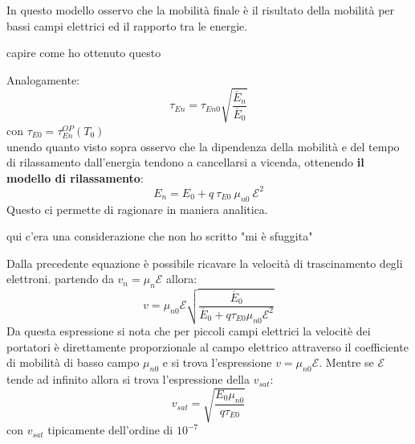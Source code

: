 %
\begin{exbox}
    In questo modello osservo che la mobilità finale è il risultato della mobilità per bassi campi elettrici ed il rapporto tra le energie.
\end{exbox}
%
\begin{ricevimento}
    capire come ho ottenuto questo
\end{ricevimento}
%
Analogamente:
%
\begin{equation}
    \tau_{En}=\tau_{En0}\sqrt{\dfrac{\overline{E}_n}{\overline{E}_0}}
\end{equation}
%
con $\tau_{E0}=\tau_{En}^{OP}(T_0)$\\
unendo quanto visto sopra osservo che la dipendenza della mobilità e del tempo di rilassamento dall'energia tendono a cancellarsi a vicenda, ottenendo \textbf{il modello di rilassamento}:
%
\begin{equation}
    E_n=E_0+q\ \tau_{E0}\ \mu_{n0}\ \mathcal{E}^2
\end{equation}
%
Questo ci permette di ragionare in maniera analitica.
%
\begin{ricevimento}
    qui c'era una considerazione che non ho scritto "mi è sfuggita"
\end{ricevimento}
%
Dalla precedente equazione è possibile ricavare la velocità di trascinamento degli elettroni. partendo da $v_n = \mu_n \mathcal{E}$ allora:
%
\begin{equation}
    v=\mu_{n0} \mathcal{E}\sqrt{\dfrac{\overline{E}_0}{\overline{E}_0+q\tau_{E0}\mu_{n0}\mathcal{E}^2}}
\end{equation}
%
Da questa espressione si nota che per piccoli campi elettrici la velocitè dei portatori è direttamente proporzionale al campo elettrico attraverso il coefficiente di mobilità di basso campo $\mu_{n0}$ e si trova l'espressione $v=\mu_{n0}\mathcal{E}$. Mentre se $\mathcal{E}$ tende ad infinito allora si trova l'espressione della $v_{sat}$:
%
\begin{equation}
    v_{sat}=\sqrt{\dfrac{E_0\mu_{n0}}{q\tau_{E0}}}
\end{equation}
con $v_{sat}$ tipicamente dell'ordine di $10^{-7}$ 
%

